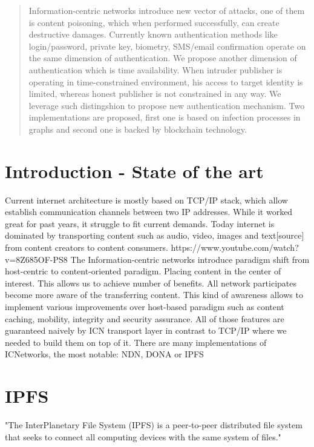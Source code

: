 \documentclass[nostrict]{szablonPG}
\begin{document}
\tableofcontents
\listoffigures


\begin{abstract}
Information-centric networks introduce new vector of attacks, one of them is content poisoning, which when performed successfully, can create destructive damages. Currently known authentication methods like login/password, private key, biometry, SMS/email confirmation operate on the same dimension of authentication. We propose another dimension of authentication which is time availability. When intruder publisher is operating in time-constrained environment, his access to target identity is limited, whereas honest publisher is not constrained in any way. We leverage such distingshion to propose new authentication mechanism. Two implementations are proposed, first one is based on infection processes in graphs and second one is backed by blockchain technology. 


\end{abstract}


\section{Introduction - State of the art}
Current internet architecture is mostly based on TCP/IP stack, which allow  establish communication channels between two IP addresses. While it worked great for past years,  it struggle to fit current demands. Today internet is dominated by transporting content such as audio, video, images and text[source] from content creators to content consumers. 
https://www.youtube.com/watch?v=8Z685OF-PS8
The Information-centric networks introduce paradigm shift from host-centric to content-oriented paradigm. Placing content in the center of interest. This allows us to achieve number of benefits. All network participates become more aware of the transferring content. This kind of awareness allows to implement various improvements over host-based paradigm such as content caching, mobility, integrity and security assurance. All of those features are guaranteed naively by ICN transport layer in contrast to TCP/IP where we needed to build them on top of it. There are many implementations of ICNetworks, the most notable:  NDN\cite{zhang2014named}, DONA\cite{koponen2007data} or IPFS \cite{benet2014ipfs}

\section{IPFS}
"The InterPlanetary File System (IPFS) is a peer-to-peer distributed file system that seeks to connect all computing devices with the same system of files."  \cite{benet2014ipfs} %
\end{document}

